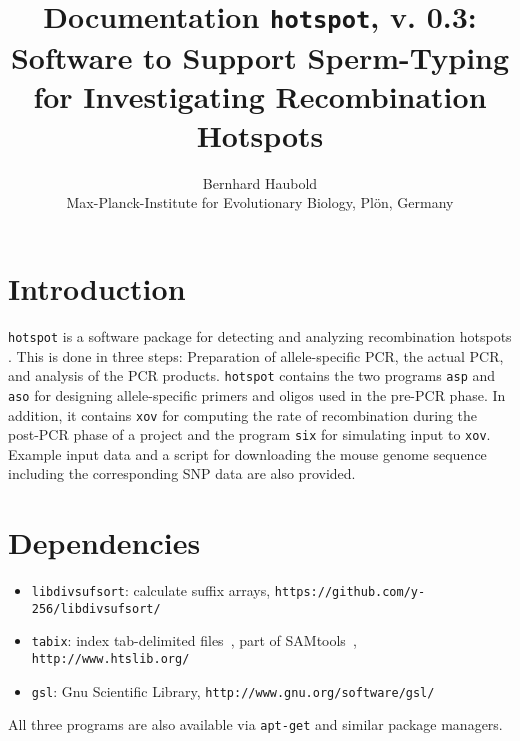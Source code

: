 \documentclass{article}
\newcommand{\bi}{\begin{itemize}}
\newcommand{\ei}{\end{itemize}}
\newcommand{\I}{\item}
\newcommand{\ty}{\texttt}
\newcommand{\version}{0.3}
\begin{document}
\title{Documentation \ty{hotspot}, v. \version: Software to Support Sperm-Typing for
Investigating Recombination Hotspots}
\author{Bernhard Haubold\\\small Max-Planck-Institute for Evolutionary Biology, Pl\"on, Germany}
\maketitle
\section{Introduction}
\ty{hotspot} is a software package for detecting and analyzing
recombination hotspots \cite{ode15:hot}. This is done in three steps:
Preparation of allele-specific PCR, the actual PCR, and analysis of
the PCR products. \ty{hotspot} contains the two programs \ty{asp} and \ty{aso} for designing
allele-specific primers and oligos used in the pre-PCR phase. In
addition, it contains \ty{xov} for computing the rate of recombination
during the post-PCR phase of a project and the program \ty{six} for simulating input to \ty{xov}. Example input data and a script for downloading the mouse
genome sequence including the corresponding SNP data are also provided.

\section{Dependencies}
\bi
\I \ty{libdivsufsort}: calculate suffix arrays, \ty{https://github.com/y-256/libdivsufsort/}
\I \ty{tabix}: index tab-delimited files~\cite{li10:tab}, part of SAMtools~\cite{li09:seq},
\ty{http://www.htslib.org/}
\I \ty{gsl}: Gnu Scientific Library, \ty{http://www.gnu.org/software/gsl/}
\ei
All three programs are also available via \ty{apt-get} and similar
package managers.
\end{document}
